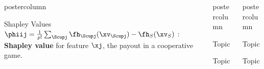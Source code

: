 \documentclass{beamer}
\newlength{\columnheight} %
\begin{document}
\begin{frame}[fragile]{}
\begin{columns}
\begin{column}{.31\textwidth}
\begin{beamercolorbox}[center]{postercolumn}
\begin{minipage}{.98\textwidth}
{\begin{myblock}{Shapley Values}
  $\phiij = \frac{1}{p!} \sum_{\Scupj} \fh_{\Scupj}(\xv_{\Scupj}) - \fh_{S}(\xv_{S})$ : \textbf{Shapley value} for feature $\xj$, the payout in a cooperative game. \\

\end{myblock}


				}
			\end{minipage}
		\end{beamercolorbox}
	\end{column}
	\begin{column}{.31\textwidth}
		\begin{beamercolorbox}[center]{postercolumn}
			\begin{minipage}{.98\textwidth}
				\parbox[t][\columnheight]{\textwidth}{


\begin{myblock}{Topic} 
\end{myblock}


\begin{myblock}{Topic} 

\end{myblock}






				}
			\end{minipage}
		\end{beamercolorbox}
	\end{column}
	\begin{column}{.31\textwidth}
		\begin{beamercolorbox}[center]{postercolumn}
			\begin{minipage}{.98\textwidth}
				\parbox[t][\columnheight]{\textwidth}{




\begin{myblock}{Topic} \vspace{-4ex}

\end{myblock}
\begin{myblock}{Topic} 
\end{myblock}


}
\end{minipage}
\end{beamercolorbox}
\end{column}
\end{columns}
\end{frame}
\end{document}
